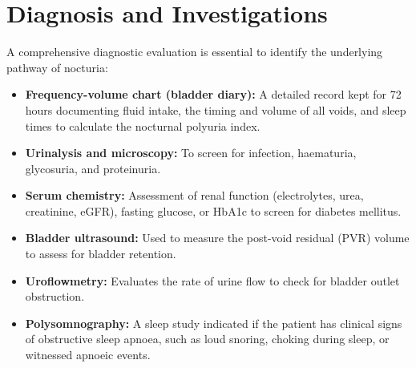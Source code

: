 \section*{Diagnosis and Investigations}
A comprehensive diagnostic evaluation is essential to identify the underlying pathway of nocturia:
\begin{itemize}
    \item \textbf{Frequency-volume chart (bladder diary):} A detailed record kept for 72 hours documenting fluid intake, the timing and volume of all voids, and sleep times to calculate the nocturnal polyuria index.
    \item \textbf{Urinalysis and microscopy:} To screen for infection, haematuria, glycosuria, and proteinuria.
    \item \textbf{Serum chemistry:} Assessment of renal function (electrolytes, urea, creatinine, eGFR), fasting glucose, or HbA1c to screen for diabetes mellitus.
    \item \textbf{Bladder ultrasound:} Used to measure the post-void residual (PVR) volume to assess for bladder retention.
    \item \textbf{Uroflowmetry:} Evaluates the rate of urine flow to check for bladder outlet obstruction.
    \item \textbf{Polysomnography:} A sleep study indicated if the patient has clinical signs of obstructive sleep apnoea, such as loud snoring, choking during sleep, or witnessed apnoeic events.
\end{itemize}

